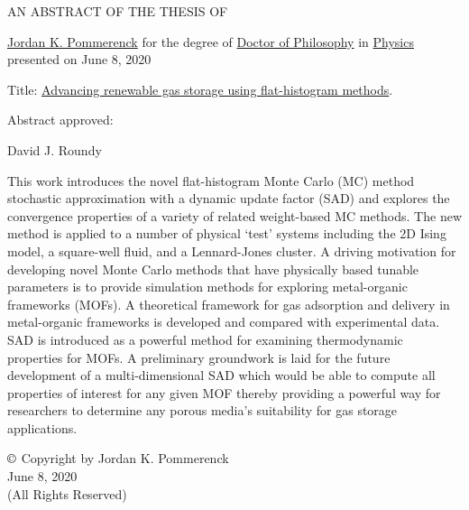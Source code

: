 \thispagestyle{empty}
\begin{center}
	\large
	AN ABSTRACT OF THE THESIS OF
\end{center}


\justify{}
\underline{Jordan K. Pommerenck} for the degree of \underline{Doctor of Philosophy} in \underline{Physics}
presented on June 8, 2020
\vspace{1.0cm}

\justify{}
Title: \underline{Advancing renewable gas storage using flat-histogram methods}.
\vspace{2.0cm}

\justify{}
Abstract approved:
\underline{\hspace{11cm}}
\vspace{0.5cm}

\hspace{7.0cm} David J. Roundy
\vspace{1.0cm}

\justify{}
\doublespacing
This work introduces the novel flat-histogram Monte
Carlo (MC) method stochastic approximation with a dynamic update factor (SAD) and explores the convergence properties of a
variety of related weight-based MC methods. The new method is applied
to a number of physical `test’ systems including the 2D Ising model, a
square-well fluid, and a Lennard-Jones cluster. A driving motivation for
developing novel Monte Carlo methods that have physically based tunable
parameters is to provide simulation methods for exploring metal-organic
frameworks (MOFs). A theoretical framework for gas adsorption and
delivery in metal-organic frameworks is developed and compared with
experimental data. SAD is introduced as a powerful method for examining
thermodynamic properties for MOFs. A preliminary groundwork is laid for
the future development of a multi-dimensional SAD which would be able
to compute all properties of interest for any given MOF thereby providing a powerful way for researchers to determine any porous media's suitability for gas storage applications.

\newpage{}
\thispagestyle{empty}
\singlespacing

\vspace*{4.0cm}
\begin{center}
$\copyright$ Copyright by Jordan K. Pommerenck \\
June 8, 2020 \\
(All Rights Reserved)
\end{center}

